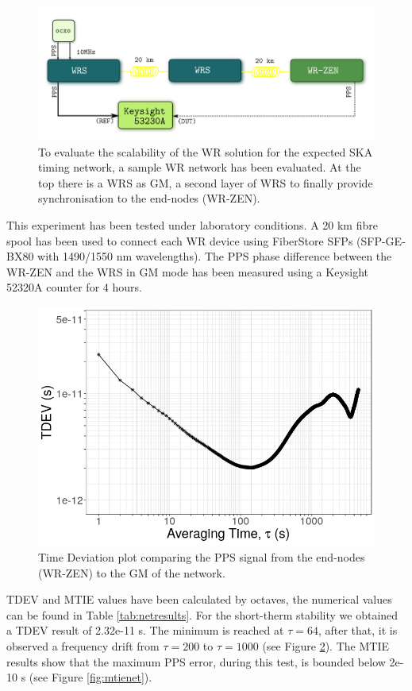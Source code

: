 \begin{figure}
	\centering
	\includegraphics[width=0.7\linewidth]{img/prueba_red}
	\caption[WR Scalability test's setup for SKA]{To evaluate the scalability 
	of the WR solution for the expected SKA timing network, a sample WR 
	network has been evaluated. At the top there is a WRS as GM, a second layer 
	of WRS to finally provide synchronisation to the end-nodes (WR-ZEN).}
	\label{fig:pruebared}
\end{figure}

This experiment has been tested under laboratory conditions. A 20 km fibre spool has been used to connect each WR device using FiberStore SFPs (SFP-GE-BX80 with 1490/1550 nm wavelengths). 
The PPS phase difference between the WR-ZEN and the WRS in GM mode has been measured  using a Keysight 52320A 
counter for 4 hours.

\begin{figure}
	\centering
	\includegraphics[width=0.7\linewidth]{img/tdev_exp3}
	\caption[TDEV of the end-nodes in the scalability test.]{Time Deviation 
	plot comparing the PPS signal from the end-nodes (WR-ZEN) to the GM of the network.}
	\label{fig:tdevnet}
\end{figure}

TDEV and MTIE values have been calculated by octaves, the numerical 
values can be found in Table \ref{tab:netresults}. For the short-therm 
stability we obtained a TDEV result of 2.32e-11 s. The minimum is reached at 
$\tau=64$, after that, it is observed a frequency drift from $\tau=200$ to 
$\tau=1000$ (see Figure \ref{fig:tdevnet}). The MTIE results show that the maximum 
PPS error, during this test, is bounded below 2e-10 s (see Figure 
\ref{fig:mtienet}).

